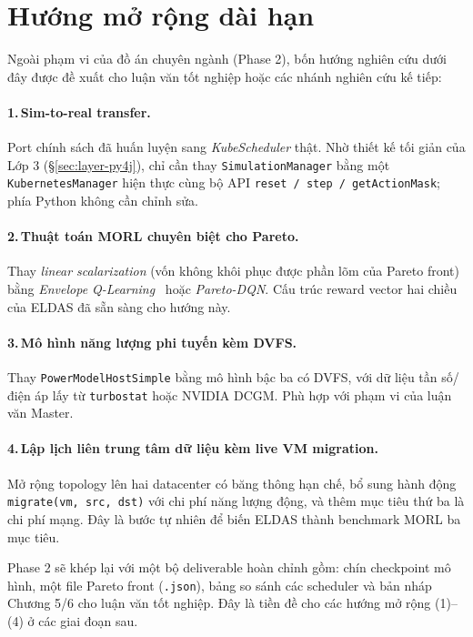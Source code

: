 \section{Hướng mở rộng dài hạn}
\label{sec:p2-future}

Ngoài phạm vi của đồ án chuyên ngành (Phase 2), bốn hướng nghiên cứu
dưới đây được đề xuất cho luận văn tốt nghiệp hoặc các nhánh nghiên
cứu kế tiếp:

\paragraph{1.\,Sim-to-real transfer.} Port chính sách đã huấn luyện
sang \textit{KubeScheduler} thật. Nhờ thiết kế tối giản của Lớp 3
(§\ref{sec:layer-py4j}), chỉ cần thay \texttt{SimulationManager}
bằng một \texttt{KubernetesManager} hiện thực cùng bộ API
\texttt{reset / step / getActionMask}; phía Python không cần chỉnh
sửa.

\paragraph{2.\,Thuật toán MORL chuyên biệt cho Pareto.} Thay
\emph{linear scalarization} (vốn không khôi phục được phần lõm của
Pareto front) bằng \textit{Envelope Q-Learning}~\cite{hayes2022practical}
hoặc \textit{Pareto-DQN}. Cấu trúc reward vector hai chiều của ELDAS
đã sẵn sàng cho hướng này.

\paragraph{3.\,Mô hình năng lượng phi tuyến kèm DVFS.} Thay
\texttt{PowerModelHostSimple} bằng mô hình bậc ba có DVFS, với dữ
liệu tần số/điện áp lấy từ \texttt{turbostat} hoặc NVIDIA DCGM.
Phù hợp với phạm vi của luận văn Master.

\paragraph{4.\,Lập lịch liên trung tâm dữ liệu kèm live VM migration.}
Mở rộng topology lên hai datacenter có băng thông hạn chế, bổ sung
hành động \texttt{migrate(vm, src, dst)} với chi phí năng lượng động,
và thêm mục tiêu thứ ba là chi phí mạng. Đây là bước tự nhiên để
biến ELDAS thành benchmark MORL ba mục tiêu.

\bigskip
\noindent
Phase 2 sẽ khép lại với một bộ deliverable hoàn chỉnh gồm: chín
checkpoint mô hình, một file Pareto front (\texttt{.json}), bảng so
sánh các scheduler và bản nháp Chương 5/6 cho luận văn tốt nghiệp.
Đây là tiền đề cho các hướng mở rộng (1)--(4) ở các giai đoạn sau.
